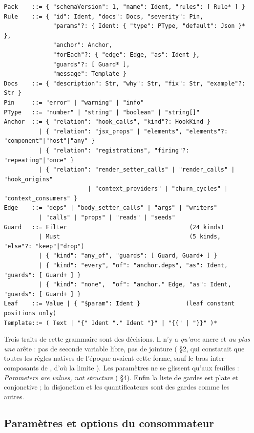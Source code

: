 \begin{lstlisting}[language={},caption={Grammaire abrégée d'un pack (pseudo-EBNF, rédigée pour ce chapitre)},label={lst:decl-ebnf}]
Pack    ::= { "schemaVersion": 1, "name": Ident, "rules": [ Rule* ] }
Rule    ::= { "id": Ident, "docs": Docs, "severity": Pin,
              "params"?: { Ident: { "type": PType, "default": Json }* },
              "anchor": Anchor,
              "forEach"?: { "edge": Edge, "as": Ident },
              "guards"?: [ Guard* ],
              "message": Template }
Docs    ::= { "description": Str, "why": Str, "fix": Str, "example"?: Str }
Pin     ::= "error" | "warning" | "info"
PType   ::= "number" | "string" | "boolean" | "string[]"
Anchor  ::= { "relation": "hook_calls", "kind"?: HookKind }
          | { "relation": "jsx_props" | "elements", "elements"?: "component"|"host"|"any" }
          | { "relation": "registrations", "firing"?: "repeating"|"once" }
          | { "relation": "render_setter_calls" | "render_calls" | "hook_origins"
                        | "context_providers" | "churn_cycles" | "context_consumers" }
Edge    ::= "deps" | "body_setter_calls" | "args" | "writers"
          | "calls" | "props" | "reads" | "seeds"
Guard   ::= Filter                                   (24 kinds)
          | Must                                     (5 kinds, "else"?: "keep"|"drop")
          | { "kind": "any_of", "guards": [ Guard, Guard+ ] }
          | { "kind": "every", "of": "anchor.deps", "as": Ident, "guards": [ Guard+ ] }
          | { "kind": "none",  "of": "anchor." Edge, "as": Ident, "guards": [ Guard+ ] }
Leaf    ::= Value | { "$param": Ident }             (leaf constant positions only)
Template::= ( Text | "{" Ident "." Ident "}" | "{{" | "}}" )*
\end{lstlisting}

Trois traits de cette grammaire sont des décisions. Il n'y a \emph{qu'une} ancre et \emph{au plus une} arête : pas de seconde variable libre, pas de jointure ( §2, qui constatait que toutes les règles natives de l'époque avaient cette forme, sauf le bras inter-composants de , d'où la limite ). Les paramètres ne se glissent qu'aux feuilles : \og \emph{Parameters are values, not structure}\fg{} ( §4). Enfin la liste de gardes est plate et conjonctive ; la disjonction et les quantificateurs sont des gardes comme les autres.

\subsection{Paramètres et options du consommateur}

